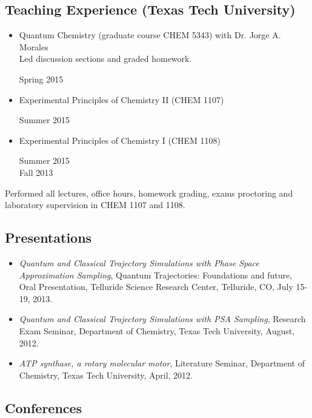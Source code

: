 \documentclass[
]{article}
\providecommand{\tightlist}{%
  \setlength{\itemsep}{0pt}\setlength{\parskip}{0pt}}
\begin{document}
\hypertarget{teaching-experience-texas-tech-university}{%
\subsection{Teaching Experience (Texas Tech
University)}\label{teaching-experience-texas-tech-university}}

\begin{itemize}
\item
  Quantum Chemistry (graduate course CHEM 5343) with Dr. Jorge A.
  Morales\\
  Led discussion sections and graded homework.

  Spring 2015
\item
  Experimental Principles of Chemistry II (CHEM 1107)

  Summer 2015
\item
  Experimental Principles of Chemistry I (CHEM 1108)

  Summer 2015\\
  Fall 2013
\end{itemize}

Performed all lectures, office hours, homework grading, exams proctoring
and laboratory supervision in CHEM 1107 and 1108.

\hypertarget{presentations}{%
\subsection{Presentations}\label{presentations}}

\begin{itemize}
\tightlist
\item
  \emph{Quantum and Classical Trajectory Simulations with Phase Space
  Approximation Sampling}, Quantum Trajectories: Foundations and future,
  Oral Presentation, Telluride Science Research Center, Telluride, CO,
  July 15-19, 2013.
\item
  \emph{Quantum and Classical Trajectory Simulations with PSA Sampling},
  Research Exam Seminar, Department of Chemistry, Texas Tech University,
  August, 2012.
\item
  \emph{ATP synthase, a rotary molecular motor}, Literature Seminar,
  Department of Chemistry, Texas Tech University, April, 2012.
\end{itemize}

\hypertarget{conferences}{%
\subsection{Conferences}\label{conferences}}
\end{document}
